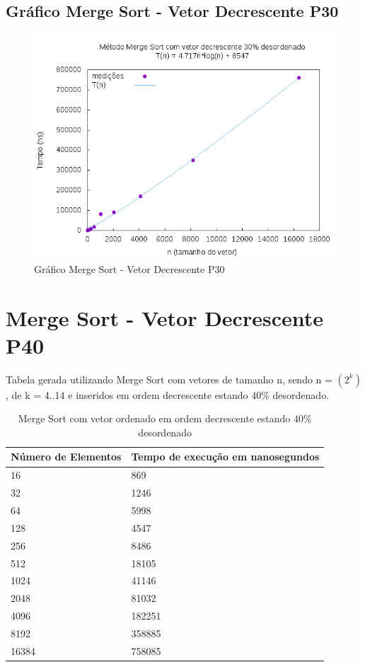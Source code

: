 \documentclass[12pt,a4paper,twoside]{report}
\begin{document}
\subsection{Gráfico Merge Sort - Vetor Decrescente P30}
\begin{figure}[H]
    \centering
    \includegraphics[width=0.7\linewidth]{graficos/MergeSort/vIntDecrescenteP30/vIntDecrescenteP30.png}
  \caption{Gráfico Merge Sort - Vetor Decrescente P30}
\end{figure}

\section{Merge Sort - Vetor Decrescente P40}
Tabela gerada utilizando Merge Sort com vetores de tamanho n, sendo n = $(2^k)$, de k = 4..14 e inseridos em ordem decrescente estando 40\% desordenado.
\begin{table}[H]
\centering
\caption{Merge Sort com vetor ordenado em ordem decrescente estando 40\% desordenado}
\label{my-label}
\begin{tabular}{|l|l|}
\hline
\multicolumn{1}{|c|}{\textbf{Número de Elementos}} & \multicolumn{1}{c|}{\textbf{Tempo de execução em nanosegundos}} \\ \hline
16 & 869 \\ \hline
32 & 1246 \\ \hline
64 & 5998 \\ \hline
128 & 4547 \\ \hline
256 & 8486 \\ \hline
512 & 18105 \\ \hline
1024 & 41146 \\ \hline
2048 & 81032 \\ \hline
4096 & 182251 \\ \hline
8192 & 358885 \\ \hline
16384 & 758085 \\ \hline
\end{tabular}
\end{table}
\end{document}
